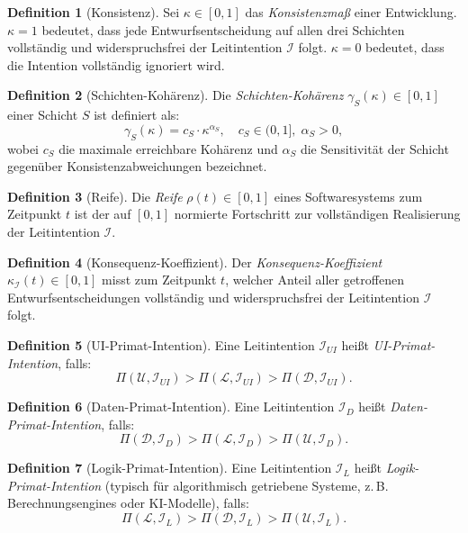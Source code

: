 ﻿\documentclass[a4paper,12pt]{article}
\theoremstyle{definition}
\newtheorem{definition}{Definition}
\begin{document}
\begin{definition}[Konsistenz]
Sei $\kappa \in [0,1]$ das \emph{Konsistenzmaß} einer Entwicklung.
$\kappa = 1$ bedeutet, dass jede Entwurfsentscheidung auf allen drei
Schichten vollständig und widerspruchsfrei der Leitintention $\mathcal{I}$
folgt. $\kappa = 0$ bedeutet, dass die Intention vollständig ignoriert wird.
\end{definition}

\begin{definition}[Schichten-Kohärenz]
Die \emph{Schichten-Kohärenz} $\gamma_S(\kappa) \in [0,1]$ einer Schicht
$S$ ist definiert als:
\[
\gamma_S(\kappa) = c_S \cdot \kappa^{\alpha_S},
\quad c_S \in (0,1], \; \alpha_S > 0,
\]
wobei $c_S$ die maximale erreichbare Kohärenz und $\alpha_S$ die
Sensitivität der Schicht gegenüber Konsistenzabweichungen bezeichnet.
\end{definition}

\begin{definition}[Reife]
Die \emph{Reife} $\rho(t) \in [0,1]$ eines Softwaresystems zum Zeitpunkt $t$
ist der auf $[0,1]$ normierte Fortschritt zur vollständigen Realisierung
der Leitintention $\mathcal{I}$.
\end{definition}

\begin{definition}[Konsequenz-Koeffizient]
Der \emph{Konsequenz-Koeffizient} $\kappa_{\mathcal{I}}(t) \in [0,1]$
misst zum Zeitpunkt $t$, welcher Anteil aller getroffenen
Entwurfsentscheidungen vollständig und widerspruchsfrei der
Leitintention $\mathcal{I}$ folgt.
\end{definition}

\begin{definition}[UI-Primat-Intention]
Eine Leitintention $\mathcal{I}_{UI}$ heißt \emph{UI-Primat-Intention}, falls:
\[
\Pi(\mathcal{U}, \mathcal{I}_{UI}) > \Pi(\mathcal{L}, \mathcal{I}_{UI})
> \Pi(\mathcal{D}, \mathcal{I}_{UI}).
\]
\end{definition}

\begin{definition}[Daten-Primat-Intention]
Eine Leitintention $\mathcal{I}_{D}$ heißt \emph{Daten-Primat-Intention}, falls:
\[
\Pi(\mathcal{D}, \mathcal{I}_{D}) > \Pi(\mathcal{L}, \mathcal{I}_{D})
> \Pi(\mathcal{U}, \mathcal{I}_{D}).
\]
\end{definition}

\begin{definition}[Logik-Primat-Intention]
Eine Leitintention $\mathcal{I}_{L}$ heißt \emph{Logik-Primat-Intention}
(typisch für algorithmisch getriebene Systeme, z.\,B. Berechnungsengines
oder KI-Modelle), falls:
\[
\Pi(\mathcal{L}, \mathcal{I}_{L}) > \Pi(\mathcal{D}, \mathcal{I}_{L})
> \Pi(\mathcal{U}, \mathcal{I}_{L}).
\]
\end{definition}
\end{document}
